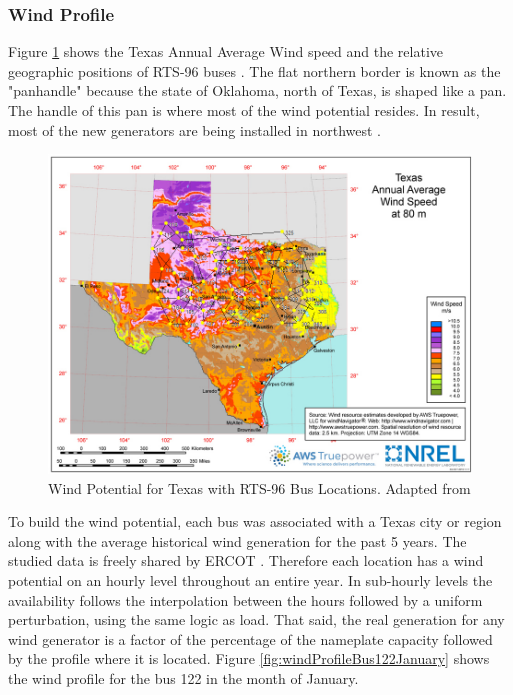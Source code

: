 \documentclass[12pt,LUDisStyle,twosided]{book}
\begin{document}
\subsubsection{Wind Profile}


Figure \ref{fig:texasWindProfile} shows the Texas Annual Average Wind speed and the relative geographic positions of RTS-96 buses \cite{wongieee}. The flat northern border is known as the "panhandle" because the state of Oklahoma, north of Texas, is shaped like a pan. The handle of this pan is where most of the wind potential resides. In result, most of the new generators are being installed in northwest \cite{texasWindProfile}.

\begin{figure}[h!] 
  \includegraphics[width=\textwidth,keepaspectratio]{texasWindProfileWithBuses.png}
  \caption{Wind Potential for Texas with RTS-96 Bus Locations. Adapted from \cite{texasWindProfile} }
  \label{fig:texasWindProfile}
\end{figure}


To build the wind potential, each bus was associated with a Texas city or region along with the average historical wind generation for the past 5 years. The studied data is freely shared by ERCOT \cite{ercotGenerationWind}. Therefore each location has a wind potential on an hourly level throughout an entire year. In sub-hourly levels the availability follows the interpolation between the hours followed by a uniform perturbation, using the same logic as load. That said, the real generation for any wind generator is a factor of the percentage of the nameplate capacity followed by the profile where it is located. Figure \ref{fig:windProfileBus122January} shows the wind profile for the bus 122 in the month of January.
\end{document}
